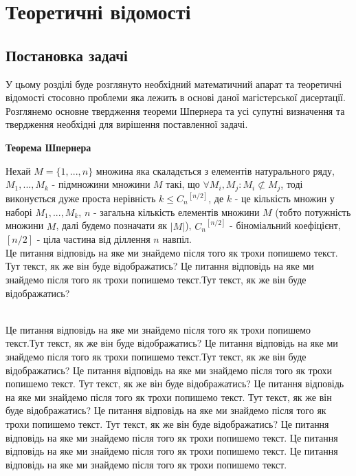 \chapter{Теоретичні відомості}
\section{Постановка задачі}
У цьому розділі буде розглянуто необхідний математичний апарат та теоретичні відомості стосовно проблеми яка лежить в основі даної магістерської дисертації. Розглянемо основне твердження теореми Шпернера та усі супутні визначення та твердження необхідні для вирішення поставленної задачі.

\textbf{Теорема Шпернера}
\par Нехай $ M = \{1,...,n\} $ множина яка скаладється з елементів натурального ряду,
$M_1,...,M_k$ - підмножини множини $ M $ такі, що $ \forall M_i,M_j: M_i \not\subset M_j $, 
тоді виконується дуже проста нерівність $k \leq {C_n}^{[n/2]}$, де $ k $ - це кількість множин у наборі $M_1,...,M_k$, $ n $ - загальна кількість елементів множини $ M $ (тобто потужність множини $ M $, далі будемо позначати як $ |M| $), $ {C_n}^{[n/2]} $ - біноміальний коефіцієнт, $ [n/2] $ - ціла частина від діллення $ n $ навпіл.
\newpage
\\
Це питання відповідь на яке ми знайдемо після того як трохи попишемо текст. Тут текст, як же він буде відображатись? Це питання відповідь на яке ми знайдемо після того як трохи попишемо текст.Тут текст, як же він буде відображатись?
\\
\begin{center}
\end{center}
\newpage
\\
Це питання відповідь на яке ми знайдемо після того як трохи попишемо текст.Тут текст, як же він буде відображатись? Це питання відповідь на яке ми знайдемо після того як трохи попишемо текст.Тут текст, як же він буде відображатись? Це питання відповідь на яке ми знайдемо після того як трохи попишемо текст. Тут текст, як же він буде відображатись? Це питання відповідь на яке ми знайдемо після того як трохи попишемо текст. Тут текст, як же він буде відображатись? Це питання відповідь на яке ми знайдемо після того як трохи попишемо текст. Тут текст, як же він буде відображатись? Це питання відповідь на яке ми знайдемо після того як трохи попишемо текст. Це питання відповідь на яке ми знайдемо після того як трохи попишемо текст. Це питання відповідь на яке ми знайдемо після того як трохи попишемо текст.
